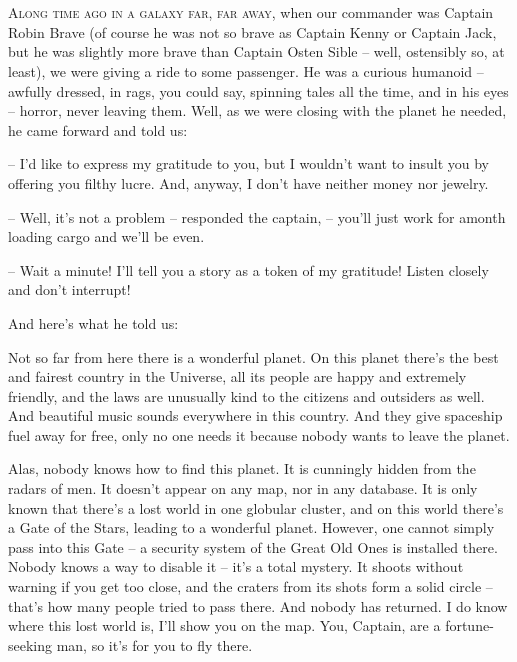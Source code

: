 \documentclass[ebook,twoside,final,openright]{memoir}
\begin{document}
\chapter{}
\par
\lettrine{A}{long time ago in a galaxy far, far away,} when our commander was Captain Robin Brave (of course he was not so brave as Captain Kenny or Captain Jack, but he was slightly more brave than Captain Osten Sible – well, ostensibly so, at least), we were giving a ride to some passenger. He was a curious humanoid – awfully dressed, in rags, you could say, spinning tales all the time, and in his eyes – horror, never leaving them. Well, as we were closing with the planet he needed, he came forward and told us: \par
\par
– I'd like to express my gratitude to you, but I wouldn’t want to insult you by offering you filthy lucre. And, anyway, I don’t have neither money nor jewelry.\par
– Well, it’s not a problem – responded the captain, – you’ll just work for amonth loading cargo and we’ll be even. \par
– Wait a minute! I'll tell you a story as a token of my gratitude! Listen closely and don’t interrupt! \par
 And here’s what he told us:\par
\par
Not so far from here there is a wonderful planet. On this planet there’s the best and fairest country in the Universe, all its people are happy and extremely friendly, and the laws are unusually kind to the citizens and outsiders as well. And beautiful music sounds everywhere in this country. And they give spaceship fuel away for free, only no one needs it because nobody wants to leave the planet. \par
Alas, nobody knows how to find this planet. It is cunningly hidden from the radars of men. It doesn’t appear on any map, nor in any database. It is only known that there’s a lost world in one globular cluster, and on this world there’s a Gate of the Stars, leading to a wonderful planet. However, one cannot simply pass into this Gate – a security system of the Great Old Ones is installed there. Nobody knows a way to disable it – it’s a total mystery. It shoots without warning if you get too close, and the craters from its shots form a solid circle – that's how many people tried to pass there. And nobody has returned. I do know where this lost world is, I'll show you on the map. You, Captain, are a fortune-seeking man, so it’s for you to fly there.\par
\end{document}
